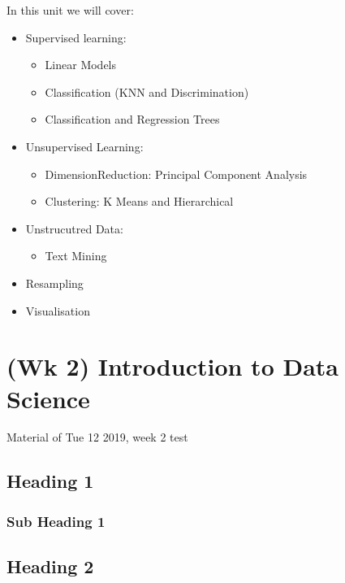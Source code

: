 \documentclass[]{book}
\providecommand{\tightlist}{%
  \setlength{\itemsep}{0pt}\setlength{\parskip}{0pt}}
\begin{document}
In this unit we will cover:

\begin{itemize}
\tightlist
\item
  Supervised learning:

  \begin{itemize}
  \tightlist
  \item
    Linear Models
  \item
    Classification (KNN and Discrimination)
  \item
    Classification and Regression Trees
  \end{itemize}
\item
  Unsupervised Learning:

  \begin{itemize}
  \tightlist
  \item
    DimensionReduction: Principal Component Analysis
  \item
    Clustering: K Means and Hierarchical
  \end{itemize}
\item
  Unstrucutred Data:

  \begin{itemize}
  \tightlist
  \item
    Text Mining
  \end{itemize}
\item
  Resampling
\item
  Visualisation
\end{itemize}

\chapter{(Wk 2) Introduction to Data
Science}\label{wk-2-introduction-to-data-science}

Material of Tue 12 2019, week 2 test

\section{Heading 1}\label{heading-1}

\subsection{Sub Heading 1}\label{sub-heading-1}

\section{Heading 2}\label{heading-2}
\end{document}

